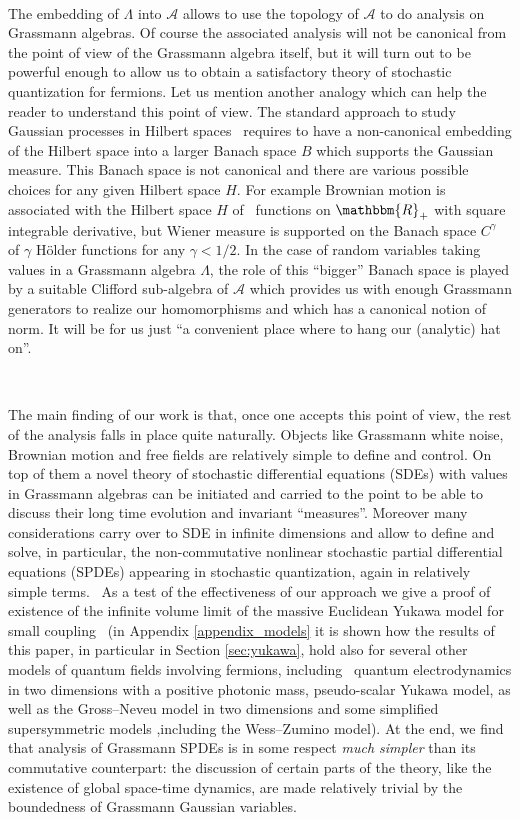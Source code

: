 \documentclass[11pt]{article}
\newcommand{\tmtextit}[1]{{\itshape{#1}}}
\begin{document}
\

The embedding of $\Lambda$ into $\mathcal{A}$ allows to use the topology of
$\mathcal{A}$ to do analysis on Grassmann algebras. Of course the associated
analysis will not be canonical from the point of view of the Grassmann algebra
itself, but it will turn out to be powerful enough to allow us to obtain a
satisfactory theory of stochastic quantization for fermions. Let us mention
another analogy which can help the reader to understand this point of view.
The standard approach to study Gaussian processes in Hilbert
spaces~{\cite{Gross1967,janson_gaussian_1997,hida_white_2013}} requires to
have a non-canonical embedding of the Hilbert space into a larger Banach space
$B$ which supports the Gaussian measure. This Banach space is not canonical
and there are various possible choices for any given Hilbert space $H$. For
example Brownian motion is associated with the Hilbert space $H$ of \
functions on $\mathbbm{R}_+$ with square integrable derivative, but Wiener
measure is supported on the Banach space $C^{\gamma}$ of $\gamma$ H{\"o}lder
functions for any $\gamma < 1 / 2$. In the case of random variables taking
values in a Grassmann algebra $\Lambda$, the role of this ``bigger'' Banach
space is played by a suitable Clifford sub-algebra of $\mathcal{A}$ which
provides us with enough Grassmann generators to realize our homomorphisms and
which has a canonical notion of norm. It will be for us just ``a convenient
place where to hang our (analytic) hat on''.

\

The main finding of our work is that, once one accepts this point of view,
the rest of the analysis falls in place quite naturally. Objects like
Grassmann white noise, Brownian motion and free fields are relatively simple
to define and control. On top of them a novel theory of stochastic
differential equations (SDEs) with values in Grassmann algebras can be
initiated and carried to the point to be able to discuss their long time
evolution and invariant ``measures''. Moreover many considerations carry over
to SDE in infinite dimensions and allow to define and solve, in particular,
the non-commutative nonlinear stochastic partial differential equations
(SPDEs) appearing in stochastic quantization, again in relatively simple
terms. \ As a test of the effectiveness of our approach we give a proof of
existence of the infinite volume limit of the massive Euclidean Yukawa model
for small
coupling~{\cite{osterwalder_euclidean_1973,osterwalder_euclidean_1973-2,lesniewski_effective_1987}}
(in Appendix \ref{appendix_models} it is shown how the results of this paper,
in particular in Section \ref{sec:yukawa}, hold also for several other models
of quantum fields involving fermions, including \ quantum electrodynamics in
two dimensions with a positive photonic mass, pseudo-scalar Yukawa model, as
well as the Gross--Neveu model in two dimensions and some simplified
supersymmetric models ,including the Wess--Zumino model). At the end, we find
that analysis of Grassmann SPDEs is in some respect \tmtextit{much simpler}
than its commutative counterpart: the discussion of certain parts of the
theory, like the existence of global space-time dynamics, are made relatively
trivial by the boundedness of Grassmann Gaussian variables.
\end{document}
